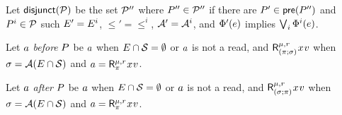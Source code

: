 \begin{definition}
  \label{def:semi:seq}
  Let $\mathsf{disjunct}(\mathcal{P})$ be the set $\mathcal{P}''$ where $P''\in\mathcal{P}''$ if
  there are $P'\in\mathsf{pre}(P'')$ and $P^i\in\mathcal{P}$ such
  $E' = E^i$, ${\le'}={\le^i}$, $\mathcal{A}'=\mathcal{A}^i$, and
  $\Phi'(e)$ implies $\bigvee_i \Phi^i(e)$.
  

  Let $a$ \emph{before} $P$ be $a$ when $E\cap\mathcal{S}=\emptyset$
  or $a$ is not a read, and
  $\DRreg[\amode]{\aReg}{(\bSub\SUBSEQ\aSub)}{\aLoc}{\aVal}$
  when 
  $\sigma=\mathcal{A}(E\cap\mathcal{S})$
  and
  $\aAct=\DRreg[\amode]{\aReg}{\bSub}{\aLoc}{\aVal}$.

  Let $a$ \emph{after} $P$ be $a$ when $E\cap\mathcal{S}=\emptyset$
  or $a$ is not a read, and
  $\DRreg[\amode]{\aReg}{(\aSub\SUBSEQ\bSub)}{\aLoc}{\aVal}$
  when 
  $\sigma=\mathcal{A}(E\cap\mathcal{S})$
  and
  $\aAct=\DRreg[\amode]{\aReg}{\bSub}{\aLoc}{\aVal}$.






\end{definition}
